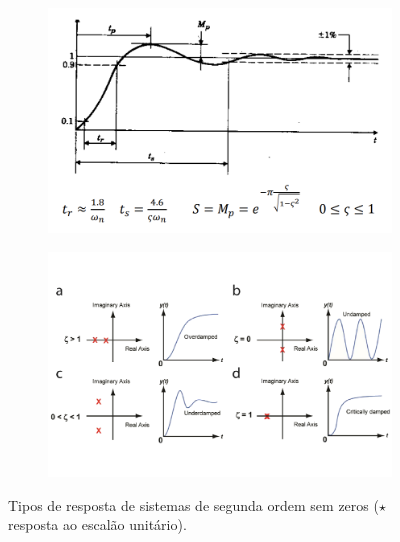 \vspace{-0.5em}
\begin{figure}[H]
    \label{fig:second-order-system-step-response}
    \begin{subfigure}[b]{0.5\linewidth}
        \centering
        \includegraphics[width=0.8\linewidth]{img/state-space-models/second-order-system-step-response.png}
        \label{fig:second-order-step-response} 
    \end{subfigure}
    \begin{subfigure}[b]{0.5\linewidth}
        \centering
        \includegraphics[width=0.85\linewidth]{img/state-space-models/step-response-second-order-system.png} 
        \label{fig:second-order-dif-cases} 
    \end{subfigure}
    \begin{minipage}{1\linewidth}
        \vspace{-1.5em}
        \caption{Tipos de resposta de sistemas de segunda ordem sem zeros ($\star$ resposta ao escalão unitário).}
    \end{minipage}
\end{figure}

